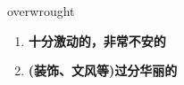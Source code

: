 
\begin{frame}
{\huge overwrought}
\begin{center}
\begin{enumerate}\Large
  \item \textbf{十分激动的，非常不安的}
  \item \textbf{(装饰、文风等)过分华丽的}
\end{enumerate}
\end{center}
\end{frame}
